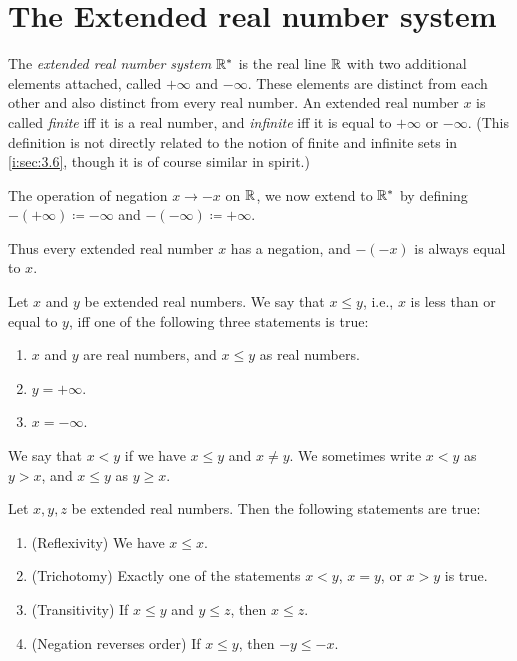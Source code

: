 \section{The Extended real number system}\label{i:sec:6.2}

\begin{defn}\label{i:6.2.1}
  The \emph{extended real number system \(\mathbb{R}^*\)} is the real line \(\mathbb{R}\) with two additional elements attached, called \(+\infty\) and \(-\infty\).
  These elements are distinct from each other and also distinct from every real number.
  An extended real number \(x\) is called \emph{finite} iff it is a real number, and \emph{infinite} iff it is equal to \(+\infty\) or \(-\infty\).
  (This definition is not directly related to the notion of finite and infinite sets in \cref{i:sec:3.6}, though it is of course similar in spirit.)
\end{defn}

\begin{defn}\label{i:6.2.2}
  The operation of negation \(x \to -x\) on \(\mathbb{R}\), we now extend to \(\mathbb{R}^*\) by defining \(-(+\infty) \coloneqq -\infty\) and \(-(-\infty) \coloneqq +\infty\).
\end{defn}

\begin{note}
  Thus every extended real number \(x\) has a negation, and \(-(-x)\) is always equal to \(x\).
\end{note}

\begin{defn}\label{i:6.2.3}
  Let \(x\) and \(y\) be extended real numbers.
  We say that \(x \leq y\), i.e., \(x\) is less than or equal to \(y\), iff one of the following three statements is true:
  \begin{enumerate}
    \item \(x\) and \(y\) are real numbers, and \(x \leq y\) as real numbers.
    \item \(y = +\infty\).
    \item \(x = -\infty\).
  \end{enumerate}
  We say that \(x < y\) if we have \(x \leq y\) and \(x \neq y\).
  We sometimes write \(x < y\) as \(y > x\), and \(x \leq y\) as \(y \geq x\).
\end{defn}

\setcounter{thm}{4}
\begin{prop}\label{i:6.2.5}
  Let \(x, y, z\) be extended real numbers.
  Then the following statements are true:
  \begin{enumerate}
    \item (Reflexivity)
          We have \(x \leq x\).
    \item (Trichotomy)
          Exactly one of the statements \(x < y\), \(x = y\), or \(x > y\) is true.
    \item (Transitivity)
          If \(x \leq y\) and \(y \leq z\), then \(x \leq z\).
    \item (Negation reverses order) If \(x \leq y\), then \(-y \leq -x\).
  \end{enumerate}
\end{prop}

